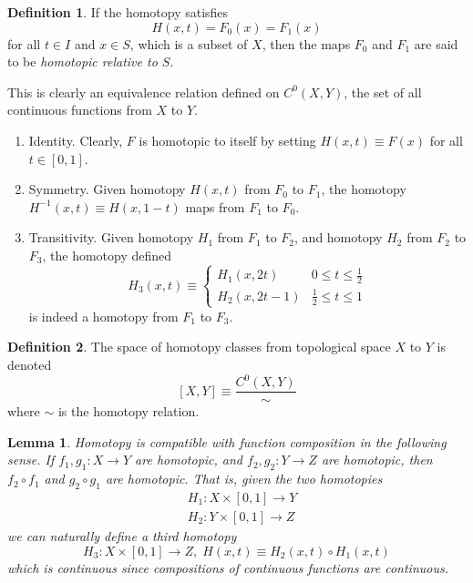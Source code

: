 \documentclass{article}
\newtheorem{lemma}[theorem]{Lemma}
\theoremstyle{remark}
\theoremstyle{definition}
\newtheorem{definition}{Definition}[section]
\begin{document}
\begin{definition}
If the homotopy satisfies 
\[H(x,t) = F_0 (x) = F_1 (x)\]
for all $t \in I$ and $x \in S$, which is a subset of $X$, then the maps $F_0$ and $F_1$ are said to be \textit{homotopic relative to $S$}. 
\end{definition}

This is clearly an equivalence relation defined on $C^0 (X, Y)$, the set of all continuous functions from $X$ to $Y$.
\begin{enumerate}
    \item Identity. Clearly, $F$ is homotopic to itself by setting $H(x, t) \equiv F(x)$ for all $t \in [0,1]$. 
    \item Symmetry. Given homotopy $H(x, t)$ from $F_0$ to $F_1$, the homotopy $H^{-1} (x, t) \equiv H(x, 1-t)$ maps from $F_1$ to $F_0$. 
    \item Transitivity. Given homotopy $H_1$ from $F_1$ to $F_2$, and homotopy $H_2$ from $F_2$ to $F_3$, the homotopy defined
    \[H_3 (x, t) \equiv \begin{cases}
          H_1 (x, 2t) & 0 \leq t \leq \frac{1}{2} \\
          H_2 (x, 2t - 1) & \frac{1}{2} \leq t \leq 1
    \end{cases}\]
    is indeed a homotopy from $F_1$ to $F_3$. 
\end{enumerate}

\begin{definition}
The space of homotopy classes from topological space $X$ to $Y$ is denoted
\[[X, Y] \equiv \frac{C^0 (X, Y)}{\sim}\]
where $\sim$ is the homotopy relation. 
\end{definition}

\begin{lemma}
Homotopy is compatible with function composition in the following sense. If $f_1, g_1: X \longrightarrow Y$ are homotopic, and $f_2, g_2: Y \longrightarrow Z$ are homotopic, then $f_2 \circ f_1$ and $g_2 \circ g_1$ are homotopic. That is, given the two homotopies
\begin{align*}
    & H_1: X \times [0,1] \longrightarrow Y \\
    & H_2: Y \times [0,1] \longrightarrow Z
\end{align*}
we can naturally define a third homotopy 
\[H_3: X \times [0,1] \longrightarrow Z, \; H(x, t) \equiv H_2 (x, t) \circ H_1(x, t)\]
which is continuous since compositions of continuous functions are continuous. 
\end{lemma}
\end{document}

